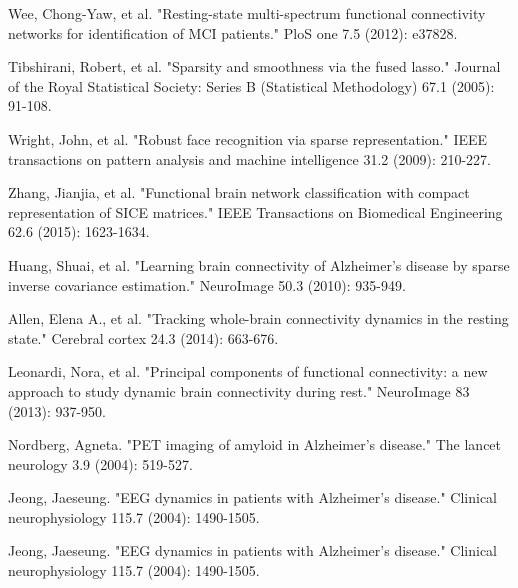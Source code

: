 \documentclass[preprint,12pt]{elsarticle}
\begin{document}
\begin{thebibliography}{1}
			Wee, Chong-Yaw, et al. "Resting-state multi-spectrum functional connectivity networks for identification of MCI patients." PloS one 7.5 (2012): e37828.
			
			Tibshirani, Robert, et al. "Sparsity and smoothness via the fused lasso." Journal of the Royal Statistical Society: Series B (Statistical Methodology) 67.1 (2005): 91-108.
			
			Wright, John, et al. "Robust face recognition via sparse representation." IEEE transactions on pattern analysis and machine intelligence 31.2 (2009): 210-227.
			
			Zhang, Jianjia, et al. "Functional brain network classification with compact representation of SICE matrices." IEEE Transactions on Biomedical Engineering 62.6 (2015): 1623-1634.
			
			Huang, Shuai, et al. "Learning brain connectivity of Alzheimer's disease by sparse inverse covariance estimation." NeuroImage 50.3 (2010): 935-949.
			
			Allen, Elena A., et al. "Tracking whole-brain connectivity dynamics in the resting state." Cerebral cortex 24.3 (2014): 663-676.
			
			
			
			Leonardi, Nora, et al. "Principal components of functional connectivity: a new approach to study dynamic brain connectivity during rest." NeuroImage 83 (2013): 937-950.
			
			
			Nordberg, Agneta. "PET imaging of amyloid in Alzheimer's disease." The lancet neurology 3.9 (2004): 519-527.
			
			Jeong, Jaeseung. "EEG dynamics in patients with Alzheimer's disease." Clinical neurophysiology 115.7 (2004): 1490-1505.
			
			Jeong, Jaeseung. "EEG dynamics in patients with Alzheimer's disease." Clinical neurophysiology 115.7 (2004): 1490-1505.
			

\end{thebibliography}
\end{document}
